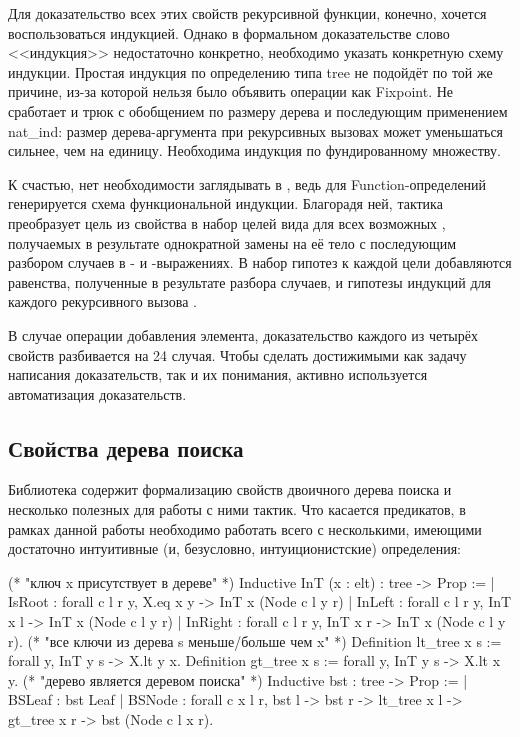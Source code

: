 \documentclass[a4paper,14pt]{extarticle}
\begin{document}
Для доказательство всех этих свойств рекурсивной функции,
конечно, хочется воспользоваться индукцией.
Однако в формальном доказательстве слово <<индукция>>
недостаточно конкретно, необходимо указать конкретную схему индукции.
Простая индукция по определению типа tree не подойдёт
по той же причине, из-за которой нельзя было объявить
операции как Fixpoint.
Не сработает и трюк с обобщением по размеру дерева и
последующим применением nat\_ind:
размер дерева-аргумента при рекурсивных вызовах
может уменьшаться сильнее, чем на единицу.
Необходима индукция по фундированному множеству.

К счастью, нет необходимости заглядывать в ,
ведь для Function-определений генерируется схема
функциональной индукции.
Благорадя ней, тактика 
преобразует цель из свойства 
в набор целей вида  для
всех возможных ,
получаемых в результате однократной замены 
на её тело с последующим разбором случаев в
- и -выражениях.
В набор гипотез к каждой цели добавляются
равенства, полученные в результате разбора случаев,
и гипотезы индукций для каждого рекурсивного вызова .

В случае операции добавления элемента,
доказательство каждого из четырёх
свойств разбивается на 24 случая.
Чтобы сделать достижимыми как задачу написания доказательств,
так и их понимания,
активно используется автоматизация доказательств.

\subsection{Свойства дерева поиска}

Библиотека  содержит
формализацию свойств двоичного дерева поиска
и несколько полезных для работы с ними тактик.
Что касается предикатов, в рамках данной работы
необходимо работать всего с несколькими,
имеющими достаточно интуитивные (и, безусловно, интуиционистские)
определения:

\begin{coqcode}
(* "ключ x присутствует в дереве" *)
Inductive InT (x : elt) : tree -> Prop :=
  | IsRoot : forall c l r y, X.eq x y
     -> InT x (Node c l y r)
  | InLeft : forall c l r y, InT x l
     -> InT x (Node c l y r)
  | InRight : forall c l r y, InT x r
     -> InT x (Node c l y r).
(* "все ключи из дерева s меньше/больше чем x" *)
Definition lt_tree x s := forall y, InT y s -> X.lt y x.
Definition gt_tree x s := forall y, InT y s -> X.lt x y.
(* "дерево является деревом поиска" *)
Inductive bst : tree -> Prop :=
  | BSLeaf : bst Leaf
  | BSNode : forall c x l r, bst l -> bst r ->
     lt_tree x l -> gt_tree x r -> bst (Node c l x r).
\end{coqcode}
\end{document}
